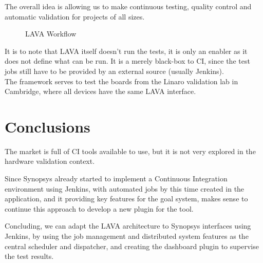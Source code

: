 The overall idea is allowing us to make continuous testing, quality control and automatic validation for projects of all sizes.

\clearpage

\begin{figure}[H]
\centering
{}
\caption{LAVA Workflow}
\label{fig:lava}
\end{figure}

It is to note that LAVA itself doesn't run the tests, it is only an enabler as it does not define what can be run. It is a merely black-box to CI, since the test jobs still have to be provided by an external source (usually Jenkins).\\
The framework serves to test the boards from the Linaro validation lab in Cambridge, where all devices have the same LAVA interface.


\section{Conclusions}
The market is full of CI tools available to use, but it is not very explored in the hardware validation context.

Since Synopsys already started to implement a Continuous Integration environment using Jenkins, with automated jobs by this time created in the application, and it providing key features for the goal system, makes sense to continue this approach to develop a new plugin for the tool.

Concluding, we can adapt the LAVA architecture to Synopsys interfaces using Jenkins, by using the job management and distributed system features as the central scheduler and dispatcher, and creating the dashboard plugin to supervise the test results.
